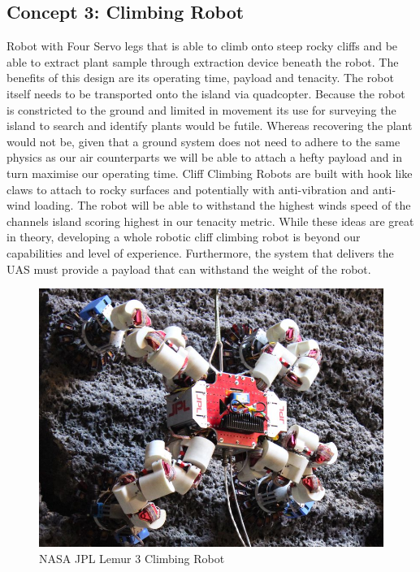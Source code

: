 \documentclass{wrcecapstone}
\begin{document}
\subsection{Concept 3:  Climbing Robot}
Robot with Four Servo legs that is able to climb onto steep rocky cliffs and be able to extract plant sample through extraction device beneath the robot. The benefits of this design are its operating time, payload and tenacity. The robot itself needs to be transported onto the island via quadcopter. Because the robot is constricted to the ground and limited in movement its use for surveying the island to search and identify plants would be futile. Whereas recovering the plant would not be, given that a ground system does not need to adhere to the same physics as our air counterparts we will be able to attach a hefty payload and in turn maximise our operating time.  Cliff Climbing Robots are built with hook like claws to attach to rocky surfaces and potentially with anti-vibration and anti-wind loading. The robot will be able to withstand the highest winds speed of the channels island scoring highest in our tenacity metric. While  these ideas are great in theory, developing a whole robotic cliff climbing robot is beyond our capabilities  and level of experience. Furthermore, the system that delivers the UAS must provide a payload that can withstand the weight of the robot. 
\begin{figure}
\begin{center}
\includegraphics[width=0.5\columnwidth]{figures/fig431.png}
\end{center}
\caption{NASA JPL Lemur 3 Climbing Robot \cite{donahue2017new}}
\label{fig:4.3.1}
\end{figure}
\end{document}
